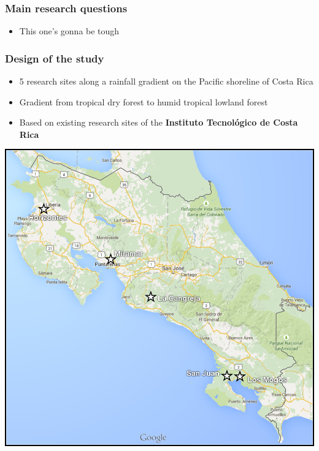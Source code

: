 \documentclass[usepdftitle=false]{beamer}
\newcommand{\Blue}[1]{{\color{blue!50!black}\textbf{#1}}}
\newcommand{\tw}{\textwidth}
\begin{document}
\begin{frame}
	\frametitle{Main research questions}
	\begin{itemize}
		\item This one's gonna be tough
	\end{itemize}
\end{frame}

\begin{frame}
	\frametitle{Design of the study}
	\begin{minipage}{0.5\tw}
		\begin{itemize}
			\item 5 research sites along a rainfall gradient on the Pacific shoreline of Costa Rica 			
			\item Gradient from tropical dry forest to humid tropical lowland forest
			\item Based on existing research sites of the \Blue{Instituto Tecnológico de Costa Rica}
		\end{itemize}		
	\end{minipage}
	\begin{minipage}{0.48\tw}
		\includegraphics[width = \tw]{figures/map_01_all_sites.png}  	
	\end{minipage}
\end{frame}
\end{document}
